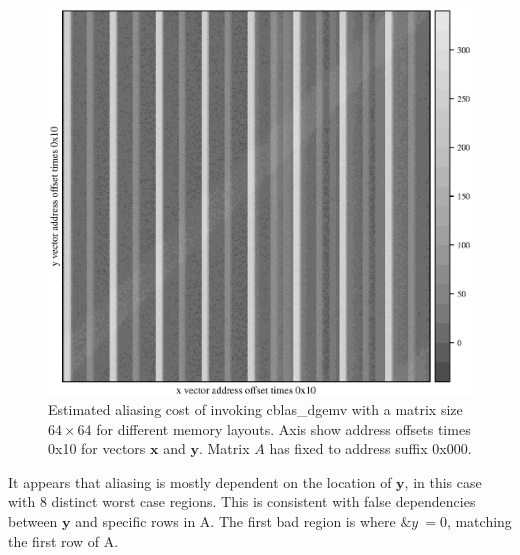 \documentclass[a4paper,10pt,twocolumn,twoside]{article}
\begin{document}
\begin{figure}[h]
  \caption{Estimated aliasing cost of invoking cblas\_dgemv with a matrix size $64 \times 64$ for different memory layouts. Axis show address offsets times 0x10 for vectors $\boldsymbol{x}$ and $\boldsymbol{y}$. Matrix $A$ has fixed to address suffix 0x000.}
  \label{fig:heatmap}
  \includegraphics[width=\columnwidth]{resources/heatmap.eps}
\end{figure}

It appears that aliasing is mostly dependent on the location of $\boldsymbol{y}$, in this case with 8 distinct worst case regions.
This is consistent with false dependencies between $\boldsymbol{y}$ and specific rows in A. 
The first bad region is where $\&y ~= 0$, matching the first row of A. 
\end{document}
